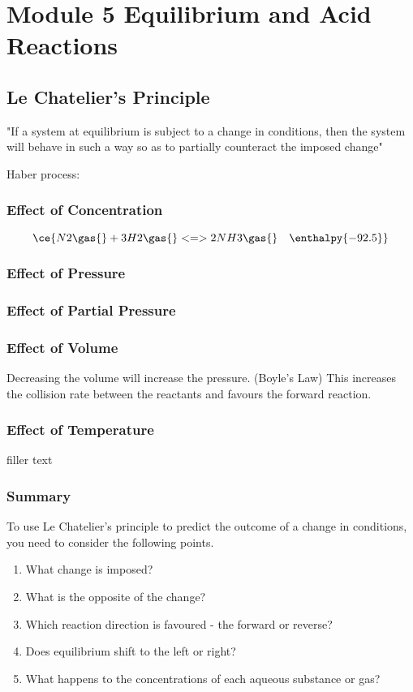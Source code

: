 
\chapter{Module 5 \; Equilibrium and Acid Reactions}

\section{Le Chatelier's Principle} \label{29/10/2024-31/10/2024}
	"If a system at equilibrium is subject to a change in conditions, then the system will behave in such a way so as to partially counteract the imposed change"

	Haber process:

	\subsection{Effect of Concentration}
		\begin{equation}
			\ce{N2\gas{} + 3H2\gas{} <=> 2NH3\gas{} \quad \enthalpy{-92.5}}
		\end{equation}
		

	\subsection{Effect of Pressure}
	\subsection{Effect of Partial Pressure}
	\subsection{Effect of Volume}
		Decreasing the volume will increase the pressure. (Boyle's Law) This increases the collision rate between the reactants and favours the forward reaction.

	\subsection{Effect of Temperature}
		filler text
	
	\subsection{Summary}
		To use Le Chatelier's principle to predict the outcome of a change in conditions, you need to consider the following points.
		\begin{enumerate}
			\item What change is imposed?
			\item What is the opposite of the change?
			\item Which reaction direction is favoured - the forward or reverse?
			\item Does equilibrium shift to the left or right?
			\item What happens to the concentrations of each aqueous substance or gas?
		\end{enumerate}

